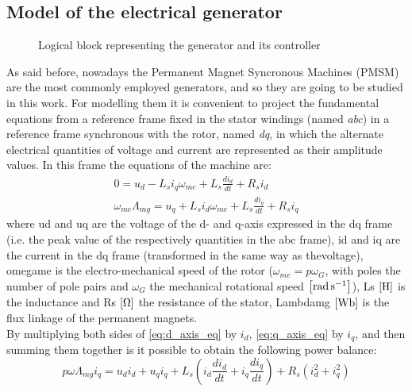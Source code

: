 \subsection[Electrical generator]{Model of the electrical generator}\label{subsec:electrical_generator_description}
\begin{figure}[htb]
  \centering
  
  \caption{Logical block representing the generator and its controller}
  \label{fig:d_generator_block}
\end{figure}

As said before, nowadays the Permanent Magnet Syncronous Machines (PMSM) are the most commonly employed generators, and so they are going to be studied in this work. For modelling them it is convenient to project the fundamental equations from a reference frame fixed in the stator windings (named \textit{abc}) in a reference frame synchronous with the rotor, named \textit{dq}, in which the alternate electrical quantities of voltage and current are represented as their amplitude values. 
In this frame the equations of the machine are:
\begin{gather}
  0=u_d-L_{s}i_q\omega_{me}+L_{s}\frac{di_d}{dt}+R_{s}i_d 
  \label{eq:d_axis_eq}\\
  \omega_{me}\Lambda_{mg}=u_q+L_{s}i_d\omega_{me}+L_{s}\frac{di_q}{dt}+R_{s}i_q
  \label{eq:q_axis_eq}
\end{gather}
where \acrshort{ud} and \acrshort{uq} are the voltage of the d- and q-axis expressed in the dq frame (i.e. the peak value of the respectively quantities in the abc frame), \acrshort{id} and \acrshort{iq} are the current in the dq frame (transformed in the same way as thevoltage), \acrshort{omegame} is the electro-mechanical speed of the rotor ($\omega_{me}=p\omega_G$, with \acrshort{poles} the number of pole pairs and $\omega_G$ the mechanical rotational speed $\left[\si{\radian \per \second}\right]$), \acrshort{Ls} $\mesunt{\henry}$ is the inductance and \acrshort{Rs} $\left[\si{\ohm}\right]$ the resistance of the stator, \acrshort{Lambdamg} $\mesunt{\weber}$ is the flux linkage of the permanent magnets.\\
By multiplying both sides of \autoref{eq:d_axis_eq} by $i_d$, \autoref{eq:q_axis_eq} by $i_q$, and then summing them together is it possible to obtain the following power balance:
\begin{equation}
  p\omega\Lambda_{mg}i_q=u_di_d + u_qi_q+ L_{s}\left(i_d\frac{di_d}{dt} + i_q\frac{di_q}{dt}\right) + R_{s}(i_d^2 + i_q^2)
  \label{eq:gen_power_balance}
\end{equation}
